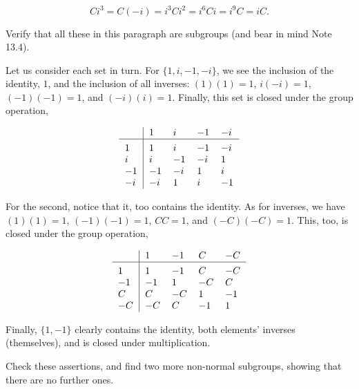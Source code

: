 \documentclass[../the-road-to-reality.tex]{subfiles}
\begin{document}
\begin{questions}
\begin{solution}
	\[
        Ci^3 = C(-i) = i^3Ci^2 = i^6Ci = i^9C = iC
	.\] 
\end{solution}

\question Verify that all these in this paragraph are subgroups (and bear in mind Note 13.4).

\begin{solution}
        Let us consider each set in turn. For $\{1, i, -1, -i\}$, we see the inclusion of the identity, $1$, and the inclusion of all inverses: $(1)(1) = 1$, $i(-i) = 1$, $(-1)(-1) = 1$, and $(-i)(i) = 1$. Finally, this set is closed under the group operation,
            
        \[
        \begin{tabular}{>{$}l<{$}|*{4}{>{$}l<{$}}}
                ~  & 1  & i  & -1 & -i \\
                \hline\vrule height 12pt width 0pt
                1  & 1  & i  & -1 & -i \\
                i  & i  & -1 & -i & 1  \\
                -1 & -1 & -i & 1  & i  \\
                -i & -i & 1  & i  & -1 \\
        \end{tabular} 
        \]

        For the second, notice that it, too contains the identity. As for inverses, we have $(1)(1) = 1$, $(-1)(-1) = 1$, $CC = 1$, and $(-C)(-C) = 1$. This, too, is closed under the group operation,

        \[
        \begin{tabular}{>{$}l<{$}|*{4}{>{$}l<{$}}}
                ~  & 1  & -1 & C & -C \\
                \hline\vrule height 12pt width 0pt
                1  & 1  & -1 & C  & -C \\
                -1 & -1 & 1  & -C & C  \\
                C  & C  & -C & 1  & -1 \\
                -C & -C & C  & -1 & 1  \\
        \end{tabular} 
        \]

        Finally, $\{1, -1\}$ clearly contains the identity, both elements' inverses (themselves), and is closed under multiplication.
\end{solution}

\question Check these assertions, and find two more non-normal subgroups, showing that there are no further ones.


\end{questions}
\end{document}
